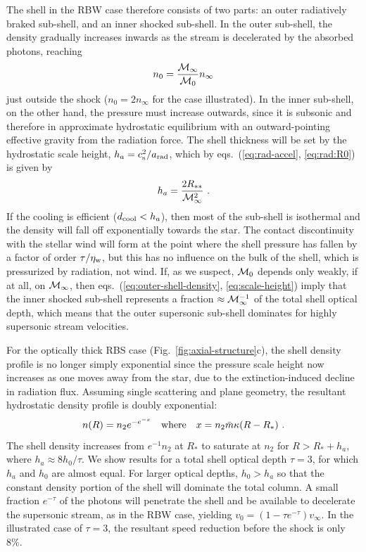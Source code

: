 The shell in the RBW case therefore consists of two parts: an outer
radiatively braked sub-shell, and an inner shocked sub-shell.  In the
outer sub-shell, the density gradually increases inwards as the stream
is decelerated by the absorbed photons, reaching
\begin{equation}
  \label{eq:outer-shell-density}
  n_0 = \frac{\mathcal{M}_\infty}{\mathcal{M}_0} n_\infty
\end{equation}
just outside the shock (\(n_0 = 2 n_\infty\) for the case illustrated).  In
the inner sub-shell, on the other hand, the pressure must increase
outwards, since it is subsonic and therefore in approximate
hydrostatic equilibrium with an outward-pointing effective gravity
from the radiation force.  The shell thickness will be set by the
hydrostatic scale height, \(h_a = c_{\text{s}}^2 / a_{\text{rad}}\), which by
eqs.~(\ref{eq:rad-accel}, \ref{eq:rad:R0}) is given by
\begin{equation}
  \label{eq:scale-height}
  h_a = \frac{2 R_{**}}{\mathcal{M}_\infty^2} \ .
\end{equation}
If the cooling is efficient (\(d_{\text{cool}} < h_a\)), then most of the
sub-shell is isothermal and the density will fall off exponentially
towards the star.  The contact discontinuity with the stellar wind
will form at the point where the shell pressure has fallen by a factor
of order \(\tau / \eta_{\text{w}}\), but this has no influence on the bulk of the
shell, which is pressurized by radiation, not wind.  If, as we
suspect, \(\mathcal{M}_0\) depends only weakly, if at all, on \(\mathcal{M}_\infty\), then
eqs.~(\ref{eq:outer-shell-density}, \ref{eq:scale-height}) imply that
the inner shocked sub-shell represents a fraction
\(\approx \mathcal{M}_\infty^{-1}\) of the total shell optical depth, which means that the
outer supersonic sub-shell dominates for highly supersonic stream
velocities.

For the optically thick RBS case (Fig.~\ref{fig:axial-structure}c),
the shell density profile is no longer simply exponential since the
pressure scale height now increases as one moves away from the star,
due to the extinction-induced decline in radiation flux. Assuming
single scattering and plane geometry, the resultant hydrostatic
density profile is doubly exponential:
\begin{equation}
  \label{eq:rbs-density-profile}
  n(R) = n_2 e^{-e^{-x}} \text{\quad where\quad } x = n_2 \bar{m} \kappa (R - R_*) \ . 
\end{equation}
The shell density increases from \(e^{-1} n_2\) at \(R_*\) to saturate
at \(n_2\) for \(R > R_* + h_a\), where \(h_a \approx 8 h_0 / \tau\).  We show
results for a total shell optical depth \(\tau = 3\), for which
\(h_a\) and \(h_0\) are almost equal.  For larger optical depths,
\(h_0 > h_a\) so that the constant density portion of the shell will
dominate the total column.  A small fraction \(e^{-\tau}\) of the photons
will penetrate the shell and be available to decelerate the supersonic
stream, as in the RBW case, yielding
\(v_0 = (1 - \tau e^{-\tau}) v_\infty\).  In the illustrated case of
\(\tau = 3\), the resultant speed reduction before the shock is only 8\%.

